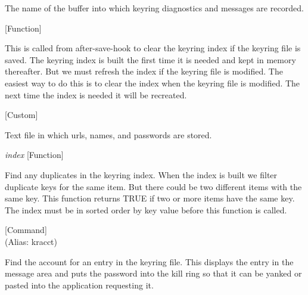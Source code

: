 \begin{doc-string}
The name of the buffer into which keyring diagnostics and messages
are recorded.
\end{doc-string}

\vspace{1em}
\noindent
{}
\usebox{\funcname}
 \hfill [Function]

\begin{doc-string}
This is called from after-save-hook to clear the keyring index if the keyring file is saved.
The keyring index is built the first time it is needed and kept in memory thereafter.  But we
must refresh the index if the keyring file is modified.  The easiest way to do this is to clear
the index when the keyring file is modified.  The next time the index is needed it will be
recreated.
\end{doc-string}

\vspace{1em}
\noindent
{}
\usebox{\funcname}
 \hfill [Custom]

\begin{doc-string}
Text file in which urls, names, and passwords are stored.
\end{doc-string}

\vspace{1em}
\noindent
{}
\usebox{\funcname}\emph{index}
 \hfill [Function]

\begin{doc-string}
Find any duplicates in the keyring index.  When the index is built we filter duplicate
keys for the same item.  But there could be two different items with the same key.  This
function returns TRUE if two or more items have the same key.  The index must be in sorted
order by key value before this function is called.
\end{doc-string}

\vspace{1em}
\noindent
{}
\usebox{\funcname}
 \hfill [Command]\\%
 (Alias: kracct)

\begin{doc-string}
Find the account for an entry in the keyring file.  This displays the entry in the message
area and puts the password into the kill ring so that it can be yanked or pasted into the application
requesting it.
\end{doc-string}

